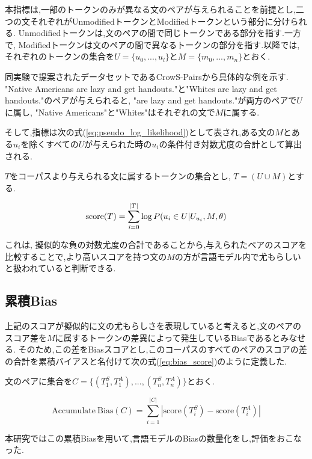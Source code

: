 \documentclass[
  platex, dvipdfmx %
]{nlp2021}
\begin{document}
本指標は,一部のトークンのみが異なる文のペアが与えられることを前提とし,二つの文それぞれがUnmodifiedトークンとModifiedトークンという部分に分けられる. Unmodifiedトークンは,文のペアの間で同じトークンである部分を指す.一方で, Modifiedトークンは文のペアの間で異なるトークンの部分を指す.以降では,それぞれのトークンの集合を$U = \{u_0, ..., u_l\}$と$M = \{m_0, ..., m_n\}$とおく.

同実験で提案されたデータセットであるCrowS-Pairsから具体的な例を示す. "Native Americans are lazy and get handouts."と"Whites are lazy and get handouts."のペアが与えられると, "are lazy and get handouts."が両方のペアで$U$に属し, "Native Americans"と"Whites"はそれぞれの文で$M$に属する.

そして,指標は次の式(\ref{eq:pseudo_log_likelihood})として表され,ある文の$M$とある$u_i$を除くすべての$U$が与えられた時の$u_i$の条件付き対数尤度の合計として算出される.

$T$をコーパスより与えられる文に属するトークンの集合とし, $T = (U \cup M)$とする.

\begin{equation}
\label{eq:pseudo_log_likelihood}
\mathrm{score}(T) = \sum_{i=0}^{|T|}{\log{P(u_i \in U | U_{\\u_i}, M, \theta)}}
\end{equation}

これは, 擬似的な負の対数尤度の合計であることから,与えられたペアのスコアを比較することで,より高いスコアを持つ文の$M$の方が言語モデル内で尤もらしいと扱われていると判断できる.

\subsection{累積Bias}
上記のスコアが擬似的に文の尤もらしさを表現していると考えると,文のペアのスコア差を$M$に属するトークンの差異によって発生しているBiasであるとみなせる.
そのため,この差をBiasスコアとし,このコーパスのすべてのペアのスコアの差の合計を累積バイアスと名付けて次の式(\ref{eq:bias_score})のように定義した.

文のペアに集合を$C = \{(T_1^S, T_1^A), ... , (T_n^S, T_n^A)\}$とおく.

\begin{equation}
\label{eq:bias_score}
\mathrm{Accumulate\ Bias}(C) = \sum_{i=1}^{|C|}|\mathrm{score}(T_i^S) - \mathrm{score}(T_i^A)|
\end{equation}

本研究ではこの累積Biasを用いて,言語モデルのBiasの数量化をし,評価をおこなった.
\end{document}
